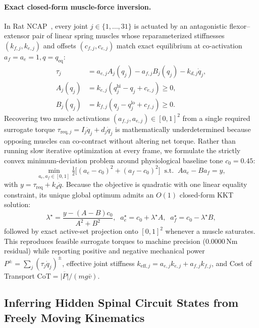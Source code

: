 \documentclass[10pt,twocolumn,letterpaper]{article}
\begin{document}
\paragraph{Exact closed-form muscle-force inversion.}
In Rat NCAP~\cite{bhattasali2026ratncap}, every joint $j \in \{1,\dots,31\}$ is actuated by an antagonistic flexor--extensor pair of linear spring muscles whose reparameterized stiffnesses $(k_{f,j}, k_{e,j})$ and offsets $(c_{f,j}, c_{e,j})$ match exact equilibrium at co-activation $a_f = a_e = 1, q = q_{\mathrm{eq}}$:
\begin{align}
  \tau_j &= a_{e,j} A_j(q_j) - a_{f,j} B_j(q_j) - k_{d,j} \dot{q}_j, \\
  A_j(q_j) &= k_{e,j}(q^{\mathrm{hi}}_j - q_j + c_{e,j}) \ge 0, \nonumber\\
  B_j(q_j) &= k_{f,j}(q_j - q^{\mathrm{lo}}_j + c_{f,j}) \ge 0. \nonumber
\end{align}
Recovering two muscle activations $(a_{f,j}, a_{e,j}) \in [0,1]^2$ from a single required surrogate torque $\tau_{\mathrm{req},j} = I_j \ddot{q}_j + d_j \dot{q}_j$ is mathematically underdetermined because opposing muscles can co-contract without altering net torque. Rather than running slow iterative optimization at every frame, we formulate the strictly convex minimum-deviation problem around physiological baseline tone $c_0 = 0.45$:
\begin{equation}
  \min_{a_e, a_f \in [0,1]} \tfrac{1}{2}\!\big[(a_e - c_0)^2 + (a_f - c_0)^2\big]
  \;\;\text{s.t.}\;\; A a_e - B a_f = y,
\end{equation}
with $y = \tau_{\mathrm{req}} + k_d \dot{q}$. Because the objective is quadratic with one linear equality constraint, its unique global optimum admits an $O(1)$ closed-form KKT solution:
\begin{equation}
  \lambda^\star = \frac{y - (A - B)c_0}{A^2 + B^2}, \;\; a_e^\star = c_0 + \lambda^\star A, \;\; a_f^\star = c_0 - \lambda^\star B,
\end{equation}
followed by exact active-set projection onto $[0,1]^2$ whenever a muscle saturates. This reproduces feasible surrogate torques to machine precision ($0.0000$\,Nm residual) while reporting positive and negative mechanical power $P^\pm = \sum_j (\tau_j \dot{q}_j)^\pm$, effective joint stiffness $k_{\mathrm{eff},j} = a_{e,j} k_{e,j} + a_{f,j} k_{f,j}$, and Cost of Transport $\mathrm{CoT} = \overline{|P|} / (mg\bar{v})$.

\subsection{Inferring Hidden Spinal Circuit States from Freely Moving Kinematics}
\end{document}
